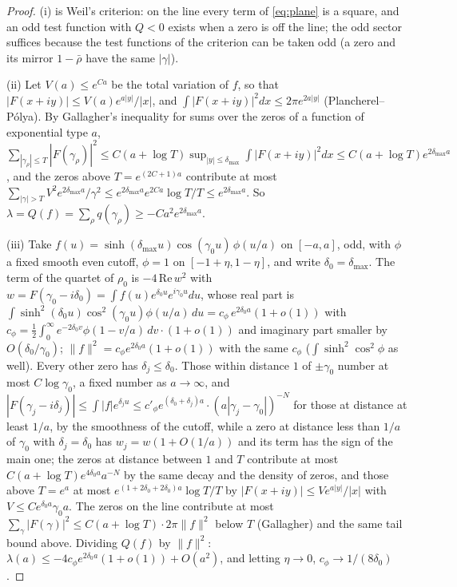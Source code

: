 \documentclass[11pt]{article}
\theoremstyle{definition}
\theoremstyle{remark}
\begin{document}
\begin{proof}
(i) is Weil's criterion: on the line every term of \eqref{eq:plane} is a square, and an odd test function with $Q<0$ exists when a zero is off the line; the odd sector suffices because the test functions of the criterion can be taken odd (a zero and its mirror $1-\bar\rho$ have the same $|\gamma|$).

(ii) Let $V(a)\le e^{Ca}$ be the total variation of $f$, so that $|F(x+iy)|\le V(a)e^{a|y|}/|x|$, and $\int|F(x+iy)|^2dx\le2\pi e^{2a|y|}$ (Plancherel--P\'olya). By Gallagher's inequality for sums over the zeros of a function of exponential type $a$, $\sum_{|\gamma_\rho|\le T}|F(\gamma_\rho)|^2\le C(a+\log T)\sup_{|y|\le\delta_{\max}}\int|F(x+iy)|^2dx\le C(a+\log T)e^{2\delta_{\max}a}$, and the zeros above $T=e^{(2C+1)a}$ contribute at most $\sum_{|\gamma|>T}V^2e^{2\delta_{\max}a}/\gamma^2\le e^{2\delta_{\max}a}e^{2Ca}\log T/T\le e^{2\delta_{\max}a}$. So $\lambda=Q(f)=\sum_\rho q(\gamma_\rho)\ge-Ca^2e^{2\delta_{\max}a}$.

(iii) Take $f(u)=\sinh(\delta_{\max}u)\cos(\gamma_0u)\,\phi(u/a)$ on $[-a,a]$, odd, with $\phi$ a fixed smooth even cutoff, $\phi=1$ on $[-1+\eta,1-\eta]$, and write $\delta_0=\delta_{\max}$. The term of the quartet of $\rho_0$ is $-4\,\mathrm{Re}\,w^2$ with $w=F(\gamma_0-i\delta_0)=\int f(u)e^{\delta_0u}e^{i\gamma_0u}du$, whose real part is $\int\sinh^2(\delta_0u)\cos^2(\gamma_0u)\phi(u/a)\,du=c_\phi\,e^{2\delta_0a}(1+o(1))$ with $c_\phi=\tfrac12\int_0^\infty e^{-2\delta_0v}\phi(1-v/a)\,dv\cdot(1+o(1))$ and imaginary part smaller by $O(\delta_0/\gamma_0)$; $\|f\|^2=c_\phi e^{2\delta_0a}(1+o(1))$ with the same $c_\phi$ ($\int\sinh^2\cos^2\phi$ as well). Every other zero has $\delta_j\le\delta_0$. Those within distance $1$ of $\pm\gamma_0$ number at most $C\log\gamma_0$, a fixed number as $a\to\infty$, and $|F(\gamma_j-i\delta_j)|\le\int|f|e^{\delta_ju}\le c'_\phi e^{(\delta_0+\delta_j)a}\cdot(a|\gamma_j-\gamma_0|)^{-N}$ for those at distance at least $1/a$, by the smoothness of the cutoff, while a zero at distance less than $1/a$ of $\gamma_0$ with $\delta_j=\delta_0$ has $w_j=w(1+O(1/a))$ and its term has the sign of the main one; the zeros at distance between $1$ and $T$ contribute at most $C(a+\log T)e^{4\delta_0a}a^{-N}$ by the same decay and the density of zeros, and those above $T=e^{a}$ at most $e^{(1+2\delta_0+2\delta_0)a}\log T/T$ by $|F(x+iy)|\le V e^{a|y|}/|x|$ with $V\le Ce^{\delta_0a}\gamma_0a$. The zeros on the line contribute at most $\sum_\gamma|F(\gamma)|^2\le C(a+\log T)\cdot2\pi\|f\|^2$ below $T$ (Gallagher) and the same tail bound above. Dividing $Q(f)$ by $\|f\|^2$: $\lambda(a)\le-4c_\phi e^{2\delta_0a}(1+o(1))+O(a^2)$, and letting $\eta\to0$, $c_\phi\to1/(8\delta_0)$.
\end{proof}
\end{document}
